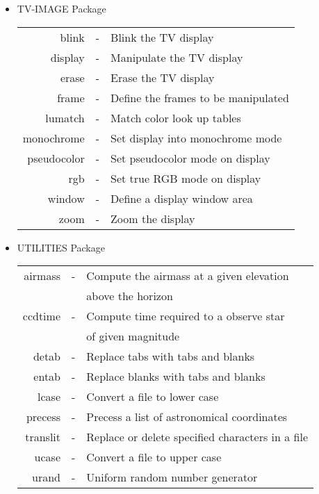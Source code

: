 \begin{itemize}
\begin{tabular}{rcl}
\end{tabular}

\item TV-IMAGE Package \\

\begin{tabular}{rcl}

      blink 	& - & Blink the TV display\\
      display	& - & Manipulate the TV display\\
      erase	& - & Erase the TV display\\
      frame	& - & Define the frames to be manipulated\\
      lumatch	& - & Match color look up tables\\
      monochrome& - & Set display into monochrome mode\\
      pseudocolor& - & Set pseudocolor mode on display\\
      rgb	& - & Set true RGB mode on display\\
      window	& - & Define a display window area\\
      zoom	& - & Zoom the display

\end{tabular}

\item UTILITIES Package \\

\begin{tabular}{rcl}

	airmass & - & Compute the airmass at a given elevation \\
		&&	above the horizon\\
	ccdtime	& - & Compute time required to a observe star \\
		&&	of given magnitude\\
	  detab	& - & Replace tabs with tabs and blanks\\
	  entab & - & Replace blanks with tabs and blanks\\
	  lcase & - & Convert a file to lower case\\
	precess & - & Precess a list of astronomical coordinates\\
       translit & - & Replace or delete specified characters in a file\\
	  ucase & - & Convert a file to upper case\\
	  urand & - & Uniform random number generator
\end{tabular}

\end{itemize}
\clearpage

